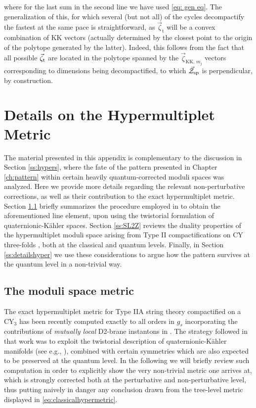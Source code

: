%
where for the last sum in the second line we have used \eqref{eq: gen eq}. The generalization of this, for which several (but not all) of the cycles decompactify the fastest at the same pace is straightforward, as $\vec{\zeta}_{\text{t}}$ will be a convex combination of KK vectors (actually determined by the closest point to the origin of the polytope generated by the latter). Indeed, this follows from the fact that all possible $\vec{\zeta}_{\rm t}$ are located in the polytope spanned by the $\vec{\zeta}_{\text{KK},\, m_j}$ vectors corresponding to dimensions being decompactified, to which $\vec{\mathcal{Z}}_{\rm sp}$ is perpendicular, by construction.

\chapter{Details on the Hypermultiplet Metric}
\label{ap:hypermetric}
	
The material presented in this appendix is complementary to the discussion in Section \ref{ss:hypers}, where the fate of the pattern presented in Chapter \ref{ch:pattern} within certain heavily quantum-corrected moduli spaces was analyzed. Here we provide more details regarding the relevant non-perturbative corrections, as well as their contribution to the exact hypermultiplet metric. Section \ref{ss:exactmetric} briefly summarizes the procedure employed in \cite{Alexandrov:2014sya} to obtain the aforementioned line element, upon using the twistorial formulation of quaternionic-K\"ahler spaces. Section \ref{ss:SL2Z} reviews the duality properties of the hypermultiplet moduli space arising from Type II compactifications on CY three-folds \cite{Bohm:1999uk, Robles-Llana:2007bbv}, both at the classical and quantum levels. Finally, in Section \ref{ss:detailshyper} we use these considerations to argue how the pattern survives at the quantum level in a non-trivial way.
	
\section{The moduli space metric}
\label{ss:exactmetric}
	
The exact hypermultiplet metric for Type IIA string theory compactified on a CY$_3$ has been recently computed exactly to all orders in $g_s$ incorporating the contributions of \emph{mutually local} D2-brane instantons in \cite{Alexandrov:2014sya}. The strategy followed in that work was to exploit the twistorial description of quaternionic-K\"ahler manifolds (see e.g., \cite{Alexandrov:2008ds,Alexandrov:2010qdt}), combined with certain symmetries which are also expected to be preserved at the quantum level. In the following we will briefly review such computation in order to explicitly show the very non-trivial metric one arrives at, which is strongly corrected both at the perturbative and non-perturbative level, thus putting naively in danger any conclusion drawn from the tree-level metric displayed in \eqref{eq:classicalhypermetric}.
	
